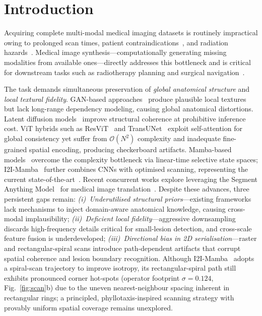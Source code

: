 \documentclass[runningheads]{llncs}
\begin{document}
\section{Introduction}
\label{sec:intro}

Acquiring complete multi-modal medical imaging datasets is routinely
impractical owing to prolonged scan times, patient
contraindications~\cite{thukral2015problems}, and radiation
hazards~\cite{pichler2008multimodal}.
Medical image synthesis---computationally generating missing modalities
from available ones---directly addresses this bottleneck and is
critical for downstream tasks such as radiotherapy planning and
surgical navigation~\cite{staartjes2021magnetic}.

The task demands simultaneous preservation of \emph{global anatomical
structure} and \emph{local textural fidelity}.
GAN-based approaches~\cite{sharma2019missing,dar2019image} produce
plausible local textures but lack long-range dependency modeling,
causing global anatomical distortions.
Latent diffusion models~\cite{rombach2022high,zhang2025structure}
improve structural coherence at prohibitive inference cost.
ViT hybrids such as ResViT~\cite{Dalmaz2022ResViT} and
TransUNet~\cite{chen2021transunet} exploit self-attention for global
consistency yet suffer from $\mathcal{O}(N^2)$ complexity and
inadequate fine-grained spatial encoding, producing checkerboard
artifacts.
Mamba-based models~\cite{gu2023mamba,Liu2024VMamba} overcome the
complexity bottleneck via linear-time selective state spaces;
I2I-Mamba~\cite{xing2024i2imamba} further combines CNNs with
optimised scanning, representing the current
state-of-the-art~\cite{heidari2024computation}.
Recent concurrent works explore leveraging the Segment Anything
Model~\cite{kirillov2023segment} for medical image
translation~\cite{huo2024sami2i}.
Despite these advances, three persistent gaps remain:
\emph{(i)~Underutilised structural priors}---existing frameworks
lack mechanisms to inject domain-aware anatomical knowledge,
causing cross-modal implausibility;
\emph{(ii)~Deficient local fidelity}---aggressive downsampling
discards high-frequency details critical for small-lesion detection,
and cross-scale feature fusion is underdeveloped;
\emph{(iii)~Directional bias in 2D serialisation}---raster and
rectangular-spiral scans introduce path-dependent artifacts that
corrupt spatial coherence and lesion boundary recognition.
Although I2I-Mamba~\cite{xing2024i2imamba} adopts a spiral-scan
trajectory to improve isotropy, its rectangular-spiral path
still exhibits pronounced corner hot-spots
(operator footprint $\sigma{=}0.124$, Fig.~\ref{fig:scan}b) due to
the uneven nearest-neighbour spacing inherent in rectangular rings;
a principled, phyllotaxis-inspired scanning strategy with provably
uniform spatial coverage remains unexplored.
\end{document}
